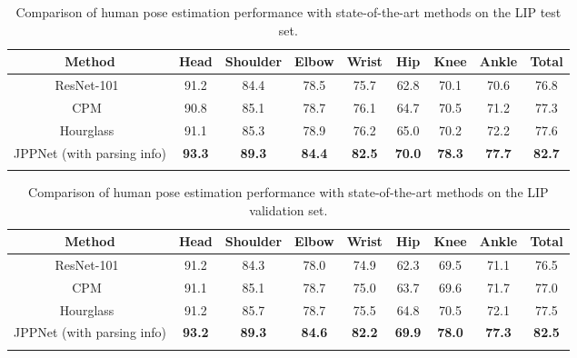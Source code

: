 \documentclass[10pt,journal,compsoc]{IEEEtran}
\begin{document}
\begin{table*}[t]
\centering
\normalsize
\vspace{-2mm}
\caption{Comparison of human pose estimation performance with state-of-the-art methods on the LIP test set.}
\vspace{-3mm}
\label{tab: lip_test_pose}
\begin{tabular}{ccccccccc}
\toprule[0.7pt]
   Method                                       & Head  & Shoulder & Elbow & Wrist & Hip  & Knee & Ankle & Total  \\ \hline 
   ResNet-101~\cite{chen2016deeplab}            & 91.2  & 84.4     & 78.5  & 75.7  & 62.8 & 70.1 & 70.6  & 76.8   \\
   CPM~\cite{Wei_2016_CVPR}                     & 90.8  & 85.1     & 78.7  & 76.1  & 64.7 & 70.5 & 71.2  & 77.3   \\
   Hourglass~\cite{newell2016stacked}           & 91.1  & 85.3     & 78.9  & 76.2  & 65.0 & 70.2 & 72.2  & 77.6   \\
   JPPNet {(with parsing info)}  & \textbf{93.3}  & \textbf{89.3} & \textbf{84.4} & \textbf{82.5} & \textbf{70.0} & \textbf{78.3} & \textbf{77.7} & \textbf{82.7} \\
\toprule[0.7pt]
\vspace{-4mm}
\end{tabular}
\end{table*}

\begin{table*}[t]
\centering
\normalsize
\vspace{-3mm}
\caption{Comparison of human pose estimation performance with state-of-the-art methods on the LIP validation set.}
\vspace{-3mm}
\label{tab: lip_val_pose}
\begin{tabular}{ccccccccc}
\toprule[0.7pt]
   Method                                       & Head  & Shoulder & Elbow & Wrist & Hip  & Knee & Ankle & Total  \\ \hline 
   ResNet-101~\cite{chen2016deeplab}            & 91.2  & 84.3     & 78.0  & 74.9  & 62.3 & 69.5 & 71.1  & 76.5   \\
   CPM~\cite{Wei_2016_CVPR}                     & 91.1  & 85.1     & 78.7  & 75.0  & 63.7 & 69.6 & 71.7  & 77.0   \\
   Hourglass~\cite{newell2016stacked}           & 91.2  & 85.7     & 78.7  & 75.5  & 64.8 & 70.5 & 72.1  & 77.5   \\
   JPPNet {(with parsing info)} & \textbf{93.2}  & \textbf{89.3} & \textbf{84.6} & \textbf{82.2} & \textbf{69.9} & \textbf{78.0} & \textbf{77.3} & \textbf{82.5} \\
\toprule[0.7pt]
\vspace{-6mm}
\end{tabular}
\end{table*}
\end{document}
